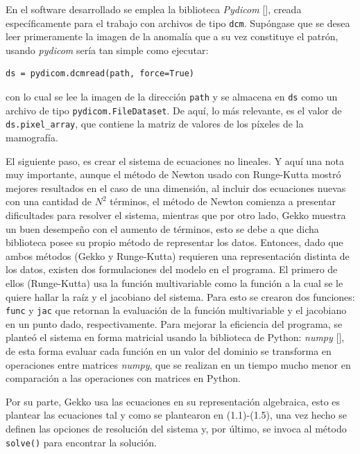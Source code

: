 \par En el software desarrollado se emplea la biblioteca \textit{Pydicom} [\cite{15}], creada espec\'ificamente para el trabajo con archivos de tipo \texttt{dcm}. Sup\'ongase que se desea leer primeramente la imagen de la anomal\'ia que a su vez constituye el patr\'on, usando \textit{pydicom} ser\'ia tan simple como ejecutar:\\
\begin{lstlisting}[caption=Leer una imagen .dcm., label=pydicom-read]
ds = pydicom.dcmread(path, force=True)
\end{lstlisting}
con lo cual se lee la imagen de la direcci\'on \texttt{path} y se almacena en \texttt{ds} como un archivo de tipo \texttt{pydicom.FileDataset}. De aqu\'i, lo m\'as relevante, es el valor de \texttt{ds.pixel\_array}, que contiene la matriz de valores de los p\'ixeles de la mamograf\'ia.\\

\par El siguiente paso, es crear el sistema de ecuaciones no lineales. Y aqu\'i una nota muy importante, aunque el m\'etodo de Newton usado con Runge-Kutta mostr\'o mejores resultados en el caso de una dimensi\'on, al incluir dos ecuaciones nuevas con una cantidad de $N^2$ t\'erminos, el m\'etodo de Newton comienza a presentar dificultades para resolver el sistema, mientras que por otro lado, Gekko muestra un buen desempe\~no con el aumento de t\'erminos, esto se debe a que dicha biblioteca posee su propio m\'etodo de representar los datos. Entonces, dado que ambos m\'etodos (Gekko y Runge-Kutta) requieren una representaci\'on distinta de los datos, existen dos formulaciones del modelo en el programa. El primero de ellos (Runge-Kutta) usa la funci\'on multivariable como la funci\'on a la cual se le quiere hallar la ra\'iz y el jacobiano del sistema. Para esto se crearon dos funciones: \texttt{func} y \texttt{jac} que retornan la evaluaci\'on de la funci\'on multivariable y el jacobiano en un punto dado, respectivamente. Para mejorar la eficiencia del programa, se plante\'o el sistema en forma matricial usando la biblioteca de Python: \textit{numpy} [\cite{14}], de esta forma evaluar cada funci\'on en un valor del dominio se transforma en operaciones entre matrices \textit{numpy}, que se realizan en un tiempo mucho menor en comparaci\'on a las operaciones con matrices en Python.
\par Por su parte, Gekko usa las ecuaciones en su representaci\'on algebraica, esto es plantear las ecuaciones tal y como se plantearon en (1.1)-(1.5), una vez hecho se definen las opciones de resoluci\'on del sistema y, por \'ultimo, se invoca al m\'etodo \texttt{solve()} para encontrar la soluci\'on.\\

